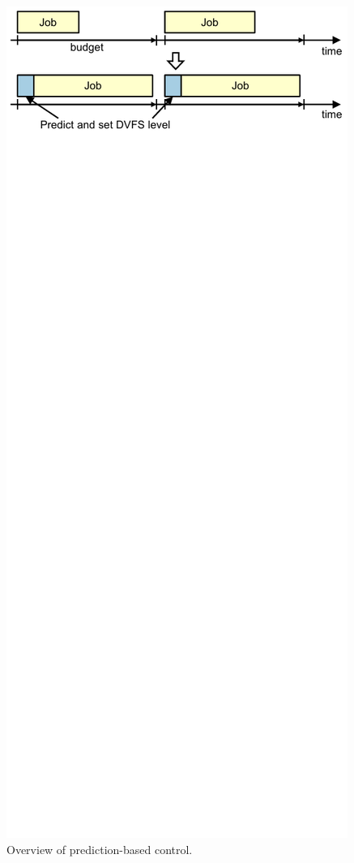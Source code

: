 \begin{figure}
  \begin{center}
    \includegraphics{exec_time_prediction/figs/prediction_overview.pdf}
    \caption{Overview of prediction-based control.}
    \label{fig:exec_time_prediction.applications.prediction_overview}
  \end{center}
\end{figure}

